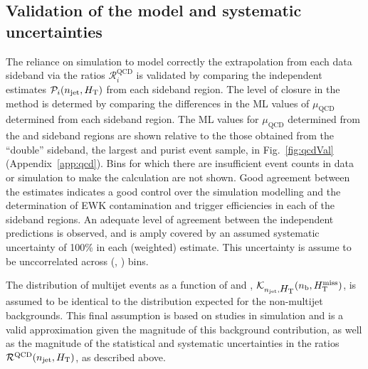 \subsection{Validation of the model and systematic uncertainties}
\label{sec:qcdValidation}

The reliance on simulation to model correctly the extrapolation from
each data sideband via the ratios $\mathcal{R}_i^\mathrm{QCD}$ is
validated by comparing the independent estimates $\mathcal{P}_i(n_{\text{jet}},
\mbox{$H_\text{T}$})$ from each sideband region. The level of closure in the
method is determed by comparing the differences in the ML values of
$\mu_{\textrm{QCD}}$ determined from each sideband region. The ML
values for $\mu_{\textrm{QCD}}$ determined from the \mhtmet and \bdphi
sideband regions are shown relative to the those obtained from the
``double'' sideband, the largest and purist event sample, in
Fig.~\ref{fig:qcdVal} (Appendix~\ref{app:qcd}). Bins for which there
are insufficient event counts in data or simulation to make the
calculation are not shown. Good agreement between the estimates
indicates a good control over the simulation modelling and the
determination of EWK contamination and trigger efficiencies in each of
the sideband regions. An adequate level of agreement between the
independent predictions is observed, and is amply covered by an
assumed systematic uncertainty of 100\% in each (weighted)
estimate. This uncertainty is assume to be unccorrelated across
(\njet, \scalht) bins.

The distribution of multijet events as a function of \nb and \HTmiss,
$\mathcal{K}_{n_{\text{jet}}, \mbox{$H_\text{T}$}}( n_{\text{b}}, \mbox{$H_{\rm T}^{\rm miss}$} )$, is assumed to be
identical to the distribution expected for the non-multijet
backgrounds. This final assumption is based on studies in simulation
and is a valid approximation given the magnitude of this background
contribution, as well as the magnitude of the statistical and
systematic uncertainties in the ratios
$\mathcal{R}^\mathrm{QCD}(n_{\text{jet}}, \mbox{$H_\text{T}$})$, as described above.






